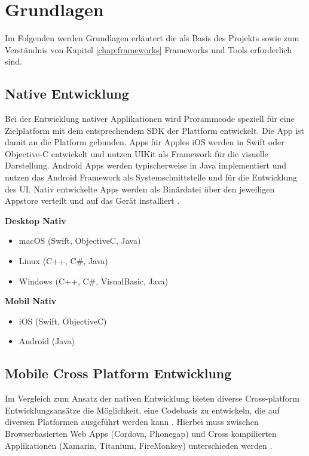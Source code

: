 
\chapter{Grundlagen}

Im Folgenden werden Grundlagen erläutert die als Basis des Projekts sowie zum Verständnis von Kapitel \ref{chap:frameworks} Frameworks und Tools erforderlich sind.


\section{Native Entwicklung}

Bei der Entwicklung nativer Applikationen wird Prorammcode speziell für eine Zielplatform mit dem entsprechendem \ac{SDK} der Plattform entwickelt.
Die App ist damit an die Platform gebunden. Apps für Apples iOS werden in Swift oder Objective-C entwickelt und nutzen UIKit als Framework für die visuelle Darstellung.
Android Apps werden typischerweise in Java implementiert und nutzen das Android Framework als Systemschnittstelle und für die Entwicklung des \ac{UI}.
Nativ entwickelte Apps werden als Binärdatei über den jeweiligen Appstore verteilt und auf das Gerät installiert \cite{Heitkoetter2013}.

\vspace{0.3cm}
\textbf{Desktop Nativ}
\begin{itemize}
\item macOS (Swift, ObjectiveC, Java)
\item Linux (C++, C\#, Java)
\item Windows (C++, C\#, VisualBasic, Java)
\end{itemize}
\vspace{0.3cm}

\textbf{Mobil Nativ}
\begin{itemize}
\item iOS (Swift, ObjectiveC)
\item Android (Java)
\end{itemize}
\vspace{0.3cm}

\section{Mobile Cross Platform Entwicklung}

Im Vergleich zum Ansatz der nativen Entwicklung bieten diverse Cross-platform Entwicklungsansätze die Möglichkeit, eine Codebasis zu entwickeln,
die auf diversen Platformen ausgeführt werden kann \cite{Heitkoetter2013}.
Hierbei muss zwischen Browserbasierten Web Apps (Cordova, Phonegap) und Cross kompilierten Applikationen (Xamarin, Titanium, FireMonkey) unterschieden werden
\cite{Xamar84:online}.

